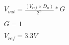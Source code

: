 \documentclass{article}
\begin{document}
$ V_{out} = \frac{(V_{ref}\times D_n)}{2^n}*G$
\pagebreak

$G=1$
\pagebreak

$V_{ref}=3.3V$
\pagebreak
\end{document}

